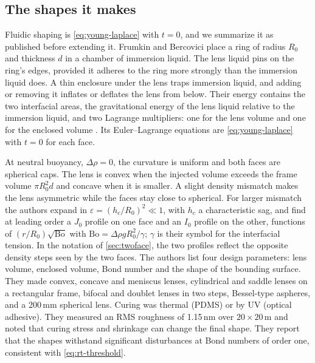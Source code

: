 \documentclass[11pt,a4paper]{article}
\numberwithin{equation}{section}
\begin{document}
\subsection{The shapes it makes}
Fluidic shaping is \cref{eq:young-laplace} with $t=0$, and we summarize it
as published before extending it. Frumkin and Bercovici
\cite{frumkin2021} place a ring of radius $R_0$ and thickness $d$ in a chamber of
immersion liquid. The lens liquid pins on the ring's edges, provided it adheres
to the ring more strongly than the immersion liquid does. A thin enclosure
under the lens traps immersion liquid, and adding or removing it inflates or
deflates the lens from below. Their energy contains the two interfacial areas,
the gravitational energy of the lens liquid relative to the immersion liquid,
and two Lagrange multipliers: one for the lens volume and one for the enclosed
volume \cite[eq.~(1)]{frumkin2021}. Its Euler--Lagrange equations are
\cref{eq:young-laplace} with $t=0$ for each face.

At neutral buoyancy, $\Delta\rho=0$, the curvature is uniform and both faces
are spherical caps. The lens is convex when the injected volume exceeds the
frame volume $\pi R_0^2d$ and concave when it is smaller. A slight density
mismatch makes the lens asymmetric while the faces stay close to spherical. For
larger mismatch the authors expand in $\varepsilon=(h_c/R_0)^2\ll1$, with $h_c$
a characteristic sag, and find at leading order a $J_0$ profile on one face and
an $I_0$ profile on the other, functions of $(r/R_0)\sqrt{\mathrm{Bo}}$ with
$\mathrm{Bo}=\Delta\rho gR_0^2/\gamma$; $\gamma$ is their symbol for the
interfacial tension. In the notation of \cref{sec:twoface}, the two profiles
reflect the opposite density steps seen by the two faces. The authors list four
design parameters: lens volume, enclosed volume, Bond number and the shape of
the bounding surface. They made convex, concave and meniscus lenses,
cylindrical and saddle lenses on a rectangular frame, bifocal and doublet lenses
in two steps, Bessel-type aspheres, and a 200\,mm spherical lens. Curing was
thermal (PDMS) or by UV (optical adhesive). They measured an RMS roughness of
1.15\,nm over $20\times20$\,\textmu m and noted that curing stress and
shrinkage can change the final shape. They report that the shapes withstand
significant disturbances at Bond numbers of order one, consistent with
\cref{eq:rt-threshold}.
\end{document}
